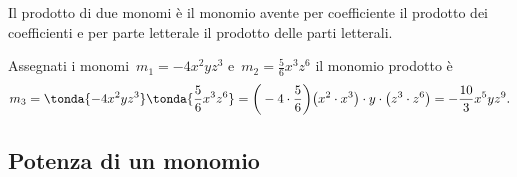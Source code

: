 \begin{definizione}
 Il prodotto di due monomi è il monomio avente
per coefficiente il prodotto dei coefficienti e per parte letterale il
prodotto delle parti letterali.
\end{definizione}

\begin{exrig}
 \begin{esempio}
Assegnati i monomi~$m_{1}=-4x^{2}yz^{3}$ e~$m_{2}=\frac{5}{6}x^{3}z^{6}$
il monomio prodotto è
\[m_{3}=\tonda{-4x^{2}yz^{3}} \tonda{\frac{5}{6}x^{3}z^{6}}=
\bigg(-4\cdot {\frac{5}{6}}\bigg)\big(x^{2}\cdot x^{3}\big)\cdot 
y\cdot \big(z^{3}\cdot z^{6}\big)=-\frac{10}{3}x^{5}yz^{9}.\]
 \end{esempio}
\end{exrig}


% 

% 


\subsection{Potenza di un monomio}
\label{subsec:09_monomi_potenza}


